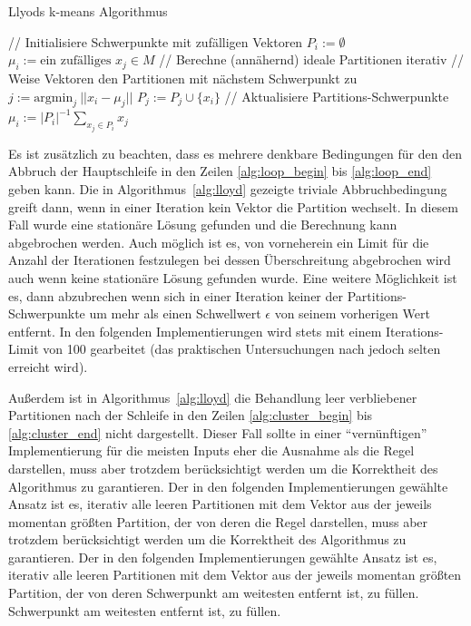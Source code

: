 \documentclass[
    bibliography=totoc, cd=lightcolor, cdmath=false, ngerman]{tudscrreprt}
\begin{document}
\begin{algorithm}
    \caption{Llyods k-means Algorithmus}
    \begin{algorithmic}[1]
            \State // Initialisiere Schwerpunkte mit zufälligen Vektoren
                \State $P_i := \emptyset$
                \State $\mu_i := \text{ein zufälliges } x_j \in M$
            \EndFor
            \State // Berechne (annähernd) ideale Partitionen iterativ
             \label{alg:loop_begin}
                \State // Weise Vektoren den Partitionen mit nächstem Schwerpunkt zu
                 \label{alg:cluster_begin}
                    \State $j := \mathrm{argmin}_j\ ||x_i - \mu_j||$
                    \State $P_j := P_j \cup \{x_i\}$
                \EndFor \label{alg:cluster_end}
                \State // Aktualisiere Partitions-Schwerpunkte
                    \State $\mu_i := |P_i|^{-1} \sum_{x_j \in P_i} x_j$
                \EndFor
            \EndWhile \label{alg:loop_end}
        \EndProcedure
    \end{algorithmic}
    \label{alg:lloyd}
\end{algorithm}

Es ist zusätzlich zu beachten, dass es mehrere denkbare Bedingungen für den den
Abbruch der Hauptschleife in den Zeilen \ref{alg:loop_begin} bis
\ref{alg:loop_end} geben kann. Die in Algorithmus~\ref{alg:lloyd} gezeigte
triviale Abbruchbedingung greift dann, wenn in einer Iteration kein Vektor die
Partition wechselt. In diesem Fall wurde eine stationäre Lösung gefunden und
die Berechnung kann abgebrochen werden. Auch möglich ist es, von vorneherein
ein Limit für die Anzahl der Iterationen festzulegen bei dessen Überschreitung
abgebrochen wird auch wenn keine stationäre Lösung gefunden wurde. Eine weitere
Möglichkeit ist es, dann abzubrechen wenn sich in einer Iteration keiner der
Partitions-Schwerpunkte um mehr als einen Schwellwert $\epsilon$ von seinem
vorherigen Wert entfernt. In den folgenden Implementierungen wird stets mit
einem Iterations-Limit von 100 gearbeitet (das praktischen Untersuchungen nach
jedoch selten erreicht wird).

Außerdem ist in Algorithmus~\ref{alg:lloyd} die Behandlung leer verbliebener
Partitionen nach der Schleife in den Zeilen \ref{alg:cluster_begin} bis
\ref{alg:cluster_end} nicht dargestellt. Dieser Fall sollte in einer
``vernünftigen'' Implementierung für die meisten Inputs eher die Ausnahme als
die Regel darstellen, muss aber trotzdem berücksichtigt werden um die
Korrektheit des Algorithmus zu garantieren. Der in den folgenden
Implementierungen gewählte Ansatz ist es, iterativ alle leeren Partitionen mit
dem Vektor aus der jeweils momentan größten Partition, der von deren
die Regel darstellen, muss aber trotzdem berücksichtigt werden um die Korrektheit
des Algorithmus zu garantieren. Der in den folgenden Implementierungen gewählte
Ansatz ist es, iterativ alle leeren Partitionen mit dem Vektor aus der jeweils
momentan größten Partition, der von deren Schwerpunkt am weitesten entfernt
ist, zu füllen.
Schwerpunkt am weitesten entfernt ist, zu füllen.
\end{document}
